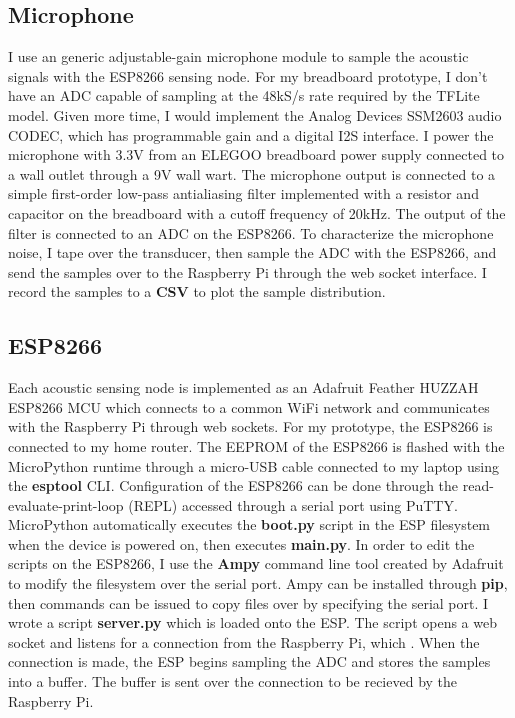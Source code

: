 \documentclass[12pt]{article}
\begin{document}
\subsection{Microphone}
	I use an generic adjustable-gain microphone module to sample the acoustic signals with the ESP8266 sensing node. For my breadboard prototype, I don't have an ADC capable of sampling at the 48kS/s rate required by the TFLite model. Given more time, I would implement the Analog Devices SSM2603 audio CODEC, which has programmable gain and a digital I2S interface. 
	I power the microphone with 3.3V from an ELEGOO breadboard power supply connected to a wall outlet through a 9V wall wart. The microphone output is connected to a simple first-order low-pass antialiasing filter implemented with a resistor and capacitor on the breadboard with a cutoff frequency of 20kHz. The output of the filter is connected to an ADC on the ESP8266.
	To characterize the microphone noise, I tape over the transducer, then sample the ADC with the ESP8266, and send the samples over to the Raspberry Pi through the web socket interface. I record the samples to a \textbf{CSV} to plot the sample distribution.

\subsection{ESP8266}
	Each acoustic sensing node is implemented as an Adafruit Feather HUZZAH ESP8266 MCU which connects to a common WiFi network and communicates with the Raspberry Pi through web sockets. For my prototype, the ESP8266 is connected to my home router. 
	The EEPROM of the ESP8266 is flashed with the MicroPython runtime through a micro-USB cable connected to my laptop using the \textbf{esptool} CLI. Configuration of the ESP8266 can be done through the read-evaluate-print-loop (REPL) accessed through a serial port using PuTTY. MicroPython automatically executes the \textbf{boot.py} script in the ESP filesystem when the device is powered on, then executes \textbf{main.py}.
	In order to edit the scripts on the ESP8266, I use the \textbf{Ampy} command line tool created by Adafruit to modify the filesystem over the serial port. Ampy can be installed through \textbf{pip}, then commands can be issued to copy files over by specifying the serial port.
	I wrote a script \textbf{server.py} which is loaded onto the ESP. The script opens a web socket and listens for a connection from the Raspberry Pi, which . When the connection is made, the ESP begins sampling the ADC and stores the samples into a buffer. The buffer is sent over the connection to be recieved by the Raspberry Pi.
\end{document}
